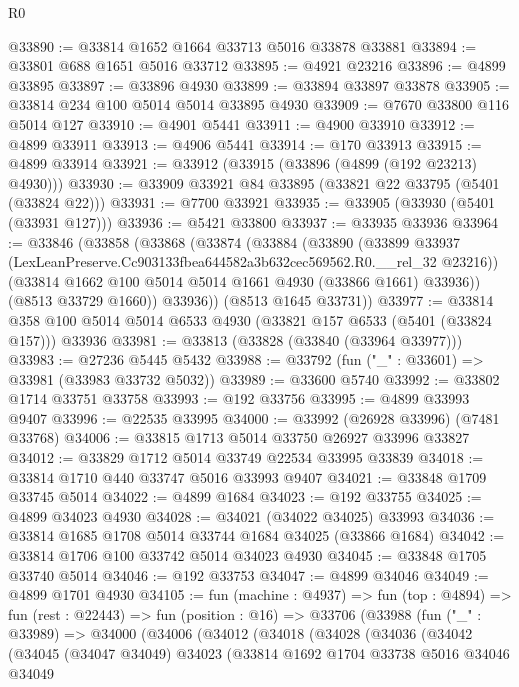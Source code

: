 \begin{lexlean}{R0}
\begin{coremodule}
@33890 := @33814 @1652 @1664 @33713 @5016 @33878 @33881
@33894 := @33801 @688 @1651 @5016 @33712
@33895 := @4921 @23216
@33896 := @4899 @33895
@33897 := @33896 @4930
@33899 := @33894 @33897 @33878
@33905 := @33814 @234 @100 @5014 @5014 @33895 @4930
@33909 := @7670 @33800 @116 @5014 @127
@33910 := @4901 @5441
@33911 := @4900 @33910
@33912 := @4899 @33911
@33913 := @4906 @5441
@33914 := @170 @33913
@33915 := @4899 @33914
@33921 := @33912 (@33915 (@33896 (@4899 (@192 @23213) @4930)))
@33930 := @33909 @33921 @84 @33895 (@33821 @22 @33795 (@5401 (@33824 @22)))
@33931 := @7700 @33921
@33935 := @33905 (@33930 (@5401 (@33931 @127)))
@33936 := @5421 @33800
@33937 := @33935 @33936
@33964 := @33846
    (@33858
      (@33868
        (@33874
          (@33884
            (@33890
              (@33899 @33937 (LexLeanPreserve.Cc903133fbea644582a3b632cec569562.R0.__rel_32 @23216))
              (@33814 @1662 @100 @5014 @5014 @1661 @4930 (@33866 @1661) @33936))
            (@8513 @33729 @1660))
          @33936))
      (@8513 @1645 @33731))
@33977 := @33814 @358 @100 @5014 @5014 @6533 @4930 (@33821 @157 @6533 (@5401 (@33824 @157))) @33936
@33981 := @33813 (@33828 (@33840 (@33964 @33977)))
@33983 := @27236 @5445 @5432
@33988 := @33792 (fun ("_" : @33601) => @33981 (@33983 @33732 @5032))
@33989 := @33600 @5740
@33992 := @33802 @1714 @33751 @33758
@33993 := @192 @33756
@33995 := @4899 @33993 @9407
@33996 := @22535 @33995
@34000 := @33992 (@26928 @33996) (@7481 @33768)
@34006 := @33815 @1713 @5014 @33750 @26927 @33996 @33827
@34012 := @33829 @1712 @5014 @33749 @22534 @33995 @33839
@34018 := @33814 @1710 @440 @33747 @5016 @33993 @9407
@34021 := @33848 @1709 @33745 @5014
@34022 := @4899 @1684
@34023 := @192 @33755
@34025 := @4899 @34023 @4930
@34028 := @34021 (@34022 @34025) @33993
@34036 := @33814 @1685 @1708 @5014 @33744 @1684 @34025 (@33866 @1684)
@34042 := @33814 @1706 @100 @33742 @5014 @34023 @4930
@34045 := @33848 @1705 @33740 @5014
@34046 := @192 @33753
@34047 := @4899 @34046
@34049 := @4899 @1701 @4930
@34105 := fun (machine : @4937) =>
  fun (top : @4894) =>
  fun (rest : @22443) =>
  fun (position : @16) =>
  @33706
    (@33988
      (fun ("_" : @33989) =>
      @34000
        (@34006
          (@34012
            (@34018
              (@34028
                (@34036
                  (@34042
                    (@34045
                      (@34047 @34049)
                      @34023
                      (@33814
                        @1692
                        @1704
                        @33738
                        @5016
                        @34046
                        @34049

\end{coremodule}
\end{lexlean}
